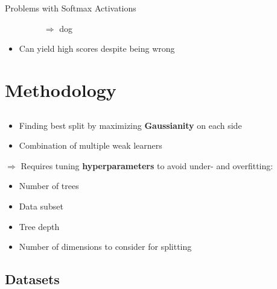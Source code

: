 \documentclass[xcolor={usenames,dvipsnames}]{beamer}
\begin{document}
\begin{frame}{Problems with Softmax Activations}
\begin{itemize}
\begin{figure}[H]
\begin{subfigure}{.1\textwidth}
			\end{subfigure} $\Rightarrow$ dog
		\end{figure}
		\pause
		\item Can yield high scores despite being wrong
	\end{itemize}
\end{frame}



\section{Methodology}
\subsection{}


\begin{frame}{}
	\begin{itemize}
		\item Finding best split by maximizing {\color{greenWUR}\textbf{Gaussianity}} on each side
		\item Combination of multiple weak learners
	\end{itemize}
	\vfill
	$\Rightarrow$ Requires tuning {\color{greenWUR}\textbf{hyperparameters}} to avoid under- and overfitting:
	\begin{itemize}	
		\item Number of trees
		\item Data subset
		\item Tree depth
		\item Number of dimensions to consider for splitting
	\end{itemize}
\end{frame}

\subsection{Datasets}
\end{document}
